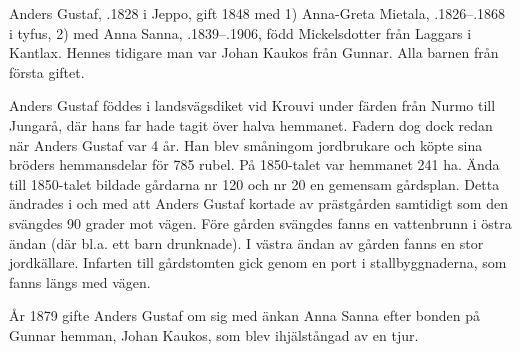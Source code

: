 Anders Gustaf, .1828 i Jeppo, gift 1848 med 1) Anna-Greta Mietala, .1826--.1868 i tyfus, 2) med Anna Sanna, .1839--.1906, född Mickelsdotter från Laggars i Kantlax. Hennes tidigare man var Johan Kaukos från Gunnar. Alla barnen från första giftet.
\begin{jhchildren}
  \item {}
  \item {}
  \item {}
  \item {}
  \item {}
  \item {}
  \item {}
  \item {}
  \item {}
  \item {}
\end{jhchildren}
Anders Gustaf föddes i landsvägsdiket vid Krouvi under färden från Nurmo till Jungarå, där hans far hade tagit över halva hemmanet. Fadern dog dock redan när Anders Gustaf var 4 år. Han blev småningom jordbrukare och köpte sina bröders hemmansdelar för 785 rubel. På 1850-talet var hemmanet 241 ha. Ända till 1850-talet bildade gårdarna nr 120 och nr 20 en gemensam gårdsplan. Detta ändrades i och med att Anders Gustaf kortade av prästgården samtidigt som den svängdes 90 grader mot vägen. Före gården svängdes fanns en vattenbrunn i östra ändan (där bl.a. ett barn drunknade). I västra ändan av gården fanns en stor jordkällare. Infarten till gårdstomten gick genom en port i stallbyggnaderna, som fanns längs med vägen.

År 1879 gifte Anders Gustaf om sig med änkan Anna Sanna efter bonden på Gunnar hemman, Johan Kaukos, som blev ihjälstångad av en tjur.

